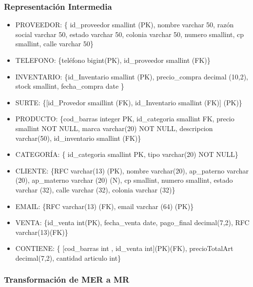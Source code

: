 \documentclass[12pt,letterpaper]{article}
\begin{document}
			\subsubsection{Representación Intermedia}
			\begin{itemize}
				\item PROVEEDOR: \{ id\_proveedor smallint (PK), nombre varchar 50, razón social varchar 50, estado varchar 50, colonia varchar 50, numero smallint, cp smallint, calle varchar 50\}
				\item TELEFONO: \{teléfono bigint(PK), id\_proveedor smallint (FK)\}
				
				\item INVENTARIO: \{id\_Inventario smallint (PK), precio\_compra decimal (10,2), stock smallint, fecha\_compra date \}
				
				\item SURTE: \{[id\_Provedor smaillint (FK), id\_Inventario smallint (FK)] (PK)\}
				
				\item PRODUCTO: \{cod\_barras integer PK, id\_categoria smallint FK, precio smallint NOT NULL, marca varchar(20) NOT NULL, descripcion varchar(50), id\_inventario smallint (FK)\}
				
				\item CATEGORÍA: \{ id\_categoria smallint PK, tipo varchar(20) NOT NULL\}
				
				\item CLIENTE: \{RFC varchar(13) (PK), nombre varchar(20), ap\_paterno varchar (20), ap\_materno varchar (20) (N), cp smallint, numero smallint, estado varchar (32), calle varchar (32), colonia varchar (32)\}
				
				\item EMAIL: \{RFC varchar(13) (FK), email varchar (64) (PK)\}
				
				\item VENTA: \{id\_venta int(PK), fecha\_venta date, pago\_final decimal(7,2), RFC varchar(13)(FK)\}
				
				\item CONTIENE: \{ [cod\_barras int , id\_venta int](PK)(FK), precioTotalArt decimal(7,2), cantidad articulo int\} 
			\end{itemize}
			
			\subsubsection{Transformación de MER a MR}
			
\end{document}
